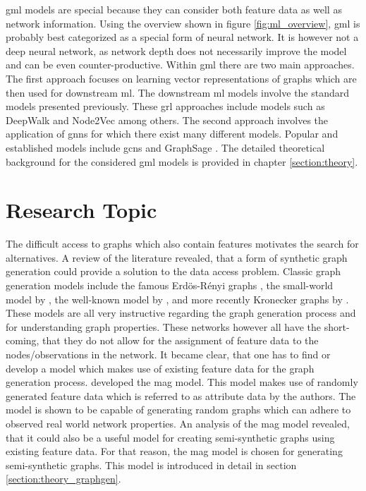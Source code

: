 	\noindent \acs{gml} models are special because they can 
	consider both feature data as well as network information. Using the
	overview shown in figure \ref{fig:ml_overview}, \acs{gml} is probably best 
	categorized as a special form of neural network. It is however not a deep 
	neural network, as network depth does not necessarily improve the model and 
	can be even counter-productive. Within \acs{gml} there are two main 
	approaches. The first approach focuses on learning vector representations of 
	graphs which are then used for downstream \acs{ml}. The downstream 
	\acs{ml} models involve the standard models presented previously. 
	These \Ac{grl} approaches include models such as DeepWalk 
	\citep{perozzi2014deepwalk} and Node2Vec \citep{grover2016node2vec} among 
	others. The second approach involves the application of \acp{gnn} for which 
	there exist many different models. Popular and established models include 
	\acp{gcn} \citep{kipf2016semi} and GraphSage \citep{hamilton2017inductive}. 
	The detailed theoretical background for the considered \acs{gml} models is 
	provided in chapter \ref{section:theory}.

	\section{Research Topic}
	\label{section:research_topics}

	\noindent The difficult access to graphs which also contain features 
	motivates the search for alternatives. A review of the literature revealed, 
	that a form of synthetic graph generation could provide a solution to the data 
	access problem. Classic graph generation models include the famous 
	Erdös-Rényi graphs \citeyearpar{erdos1959random}, the small-world model by 
	\cite{watts1998collective}, the well-known model by 
	\cite{barabasi1999emergence}, and more recently Kronecker graphs by
	\cite{leskovec2010kronecker}. These models are all very instructive
	regarding the graph generation process and for understanding graph
	properties. These networks however all have the short-coming, that they do 
	not allow for the assignment of feature data to the nodes/observations in the
	network. It became clear, that one has to find or develop a model which 
	makes use of existing feature data for the graph generation process. 
	\cite{kim2012multiplicative} developed the \ac{mag} model. This model makes 
	use of randomly generated feature data which is referred to as attribute data 
	by the authors. The model is shown to be capable of generating random graphs 
	which can adhere to observed real world network properties. An analysis of 
	the \ac{mag} model revealed, that it could also be a useful model for 
	creating semi-synthetic graphs using existing feature data. For that reason, 
	the \acs{mag} model is chosen for generating semi-synthetic graphs. This 
	model is introduced in detail in section \ref{section:theory_graphgen}. \\

